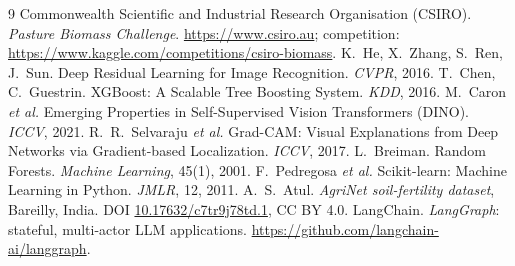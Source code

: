 \documentclass[11pt,a4paper]{article}
\begin{document}
\begin{thebibliography}{9}
\small
{} Commonwealth Scientific and Industrial Research Organisation (CSIRO).
  \emph{Pasture Biomass Challenge}. \url{https://www.csiro.au}; competition:
  \url{https://www.kaggle.com/competitions/csiro-biomass}.
 K.~He, X.~Zhang, S.~Ren, J.~Sun. Deep Residual Learning for Image Recognition.
  \emph{CVPR}, 2016.
 T.~Chen, C.~Guestrin. XGBoost: A Scalable Tree Boosting System. \emph{KDD}, 2016.
 M.~Caron \emph{et al.} Emerging Properties in Self-Supervised Vision Transformers
  (DINO). \emph{ICCV}, 2021.
 R.~R.~Selvaraju \emph{et al.} Grad-CAM: Visual Explanations from Deep Networks via
  Gradient-based Localization. \emph{ICCV}, 2017.
 L.~Breiman. Random Forests. \emph{Machine Learning}, 45(1), 2001.
 F.~Pedregosa \emph{et al.} Scikit-learn: Machine Learning in Python.
  \emph{JMLR}, 12, 2011.
 A.~S.~Atul. \emph{AgriNet soil-fertility dataset}, Bareilly, India.
  DOI \href{https://doi.org/10.17632/c7tr9j78td.1}{10.17632/c7tr9j78td.1}, CC BY 4.0.
 LangChain. \emph{LangGraph}: stateful, multi-actor LLM applications.
  \url{https://github.com/langchain-ai/langgraph}.
\end{thebibliography}
\end{document}
